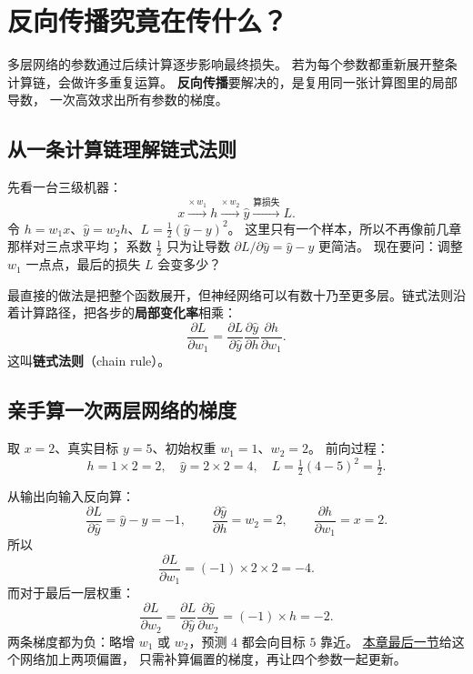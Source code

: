 \chapterrule
\section{反向传播究竟在传什么？}
\label{concept:backprop}
\label{intro:17-backpropagation}

多层网络的参数通过后续计算逐步影响最终损失。
若为每个参数都重新展开整条计算链，会做许多重复运算。
\textbf{反向传播}要解决的，是复用同一张计算图里的局部导数，
一次高效求出所有参数的梯度。

\subsection{从一条计算链理解链式法则}

先看一台三级机器：
\[
x\xrightarrow{\times\,w_1}h
\xrightarrow{\times\,w_2}\widehat{y}
\xrightarrow{\text{算损失}}L.
\]
令 $h=w_1x$、$\widehat{y}=w_2h$、$L=\tfrac12(\widehat{y}-y)^2$。
这里只有一个样本，所以不再像前几章那样对三点求平均；
系数 $\tfrac12$ 只为让导数 $\partial L/\partial\widehat{y}=\widehat{y}-y$ 更简洁。
现在要问：调整 $w_1$ 一点点，最后的损失 $L$ 会变多少？

最直接的做法是把整个函数展开，但神经网络可以有数十乃至更多层。链式法则沿着计算路径，把各步的\textbf{局部变化率}相乘：
\begin{equation}
\boxed{\frac{\partial L}{\partial w_1}
=\frac{\partial L}{\partial\widehat{y}}
\frac{\partial\widehat{y}}{\partial h}
\frac{\partial h}{\partial w_1}.}
\label{eq:chain-three}
\end{equation}
这叫\textbf{链式法则}（chain rule）。

\subsection{亲手算一次两层网络的梯度}
\label{sec:backprop-weight-gradients}

取 $x=2$、真实目标 $y=5$、初始权重 $w_1=1$、$w_2=2$。
前向过程：
\[
h=1\times2=2,\quad
\widehat{y}=2\times2=4,\quad
L=\tfrac12(4-5)^2=\tfrac12.
\]

从输出向输入反向算：
\[
\frac{\partial L}{\partial\widehat{y}}
=\widehat{y}-y=-1,\qquad
\frac{\partial\widehat{y}}{\partial h}=w_2=2,\qquad
\frac{\partial h}{\partial w_1}=x=2.
\]
所以
\[
\boxed{\frac{\partial L}{\partial w_1}
=(-1)\times2\times2=-4.}
\]
而对于最后一层权重：
\[
\frac{\partial L}{\partial w_2}
=\frac{\partial L}{\partial\widehat{y}}
\frac{\partial\widehat{y}}{\partial w_2}
=(-1)\times h=-2.
\]
两条梯度都为负：略增 $w_1$ 或 $w_2$，预测 $4$ 都会向目标 $5$ 靠近。
\hyperref[sec:end-to-end-step]{本章最后一节}给这个网络加上两项偏置，
只需补算偏置的梯度，再让四个参数一起更新。

